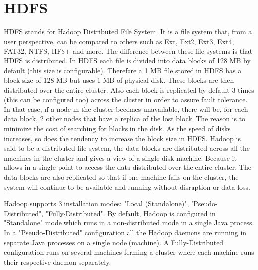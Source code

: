\documentclass[12pt,english]{book}
\begin{document}
\section{HDFS}


HDFS stands for Hadoop Distributed File System.
It is a file system that, from a user perspective, can be compared to others such as Ext, Ext2, Ext3, Ext4, FAT32, NTFS, HFS+ and more.
The difference between these file systems is that HDFS is distributed.
In HDFS each file is divided into data blocks of 128 MB by default (this size is configurable).
Therefore a 1 MB file stored in HDFS has a block size of 128 MB but uses 1 MB of physical disk.
These blocks are then distributed over the entire cluster.
Also each block is replicated by default 3 times (this can be configured too) across the cluster in order to assure fault tolerance.
In that case, if a node in the cluster becomes unavailable, there will be, for each data block, 2 other nodes that have a replica of the lost block.
The reason is to minimize the cost of searching for blocks in the disk.
As the speed of disks increases, so does the tendency to increase the block size in HDFS. 
Hadoop is said to be a distributed file system, the data blocks are distributed across all the machines in the cluster and gives a view of a single disk machine.
Because it allows in a single point to access the data distributed over the entire cluster.
The data blocks are also replicated so that if one machine fails on the cluster, the system will continue to be available and running without disruption or data loss.

Hadoop supports 3 installation modes: "Local (Standalone)", "Pseudo-Distributed", "Fully-Distributed".
By default, Hadoop is configured in "Standalone" mode which runs in a non-distributed mode in a single Java process.
In a "Pseudo-Distributed" configuration all the Hadoop daemons are running in separate Java processes on a single node (machine). A Fully-Distributed configuration runs on several machines forming a cluster where each machine runs their respective daemon separately.
\end{document}
